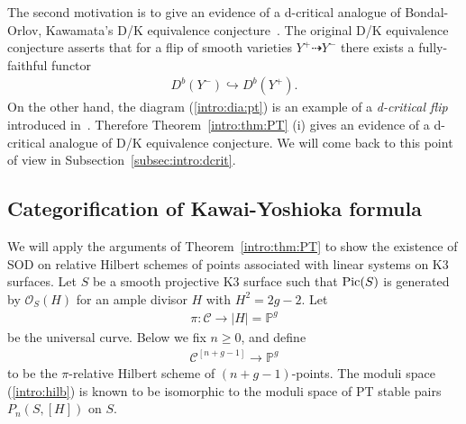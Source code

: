 \documentclass[11pt]{amsart}
\theoremstyle{plain}
\newcommand{\cC}{\mathcal{C}}
\newcommand{\oO}{\mathcal{O}}
\newcommand{\Pic}{\mathop{\rm Pic}\nolimits}
\begin{document}
The second motivation is to give an evidence 
of a d-critical analogue of 
Bondal-Orlov, Kawamata's D/K equivalence conjecture~\cite{B-O2, Ka1}. 
The original D/K equivalence conjecture 
asserts that for a flip of smooth varieties
$Y^+ \dashrightarrow Y^-$
there exists a fully-faithful
functor 
\begin{align*}
D^b(Y^-) \hookrightarrow D^b(Y^+).
\end{align*}
On the other hand, the diagram (\ref{intro:dia:pt}) is an example of a 
\textit{d-critical flip} introduced in~\cite{Toddbir}.
Therefore 
Theorem~\ref{intro:thm:PT} (i) gives an evidence of a d-critical analogue of 
D/K equivalence conjecture. 
We will come back to this point of view 
in 
Subsection~\ref{subsec:intro:dcrit}. 



















\subsection{Categorification of Kawai-Yoshioka formula}\label{subsec:intro:KY}
We will apply the arguments of Theorem~\ref{intro:thm:PT}
to show the existence of 
SOD on relative Hilbert schemes
of points associated with linear systems
on K3 surfaces. 
Let $S$ be a smooth projective K3 surface 
such that $\Pic(S)$ is generated by 
$\oO_S(H)$ for an ample divisor $H$
with $H^2=2g-2$. 
Let 
\begin{align}
\pi \colon 
\cC \to \lvert H \rvert=\mathbb{P}^g
\end{align}
 be the universal 
curve. 
Below we fix $n\ge 0$, and define 
\begin{align}\label{intro:hilb}
\cC^{[n+g-1]} \to \mathbb{P}^g
\end{align}
to 
be the 
$\pi$-relative Hilbert scheme of $(n+g-1)$-points. 
The moduli space (\ref{intro:hilb}) is known to be
isomorphic to 
the moduli space of PT stable pairs 
$P_n(S, [H])$ on $S$. 
\end{document}
